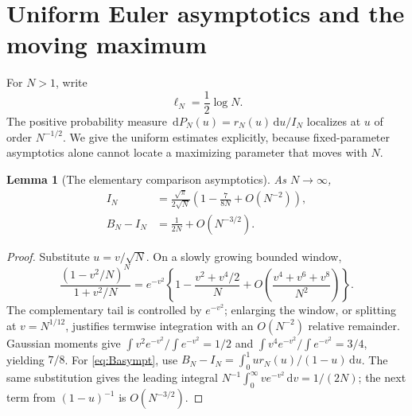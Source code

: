 \documentclass[11pt]{article}
\numberwithin{equation}{section}
\newtheorem{lemma}[theorem]{Lemma}
\theoremstyle{definition}\newtheorem{definition}[theorem]{Definition}
\theoremstyle{remark}\newtheorem{remark}[theorem]{Remark}
\newcommand{\dd}{\,\mathrm d}
\begin{document}
\section{Uniform Euler asymptotics and the moving maximum}
\label{sec:uniformEuler}
For $N>1$, write
\begin{equation}\label{eq:ellN}
 \ell_N=\frac12\log N.
\end{equation}
The positive probability measure
$\dd P_N(u)=r_N(u)\dd u/I_N$ localizes at $u$ of order $N^{-1/2}$.
We give the uniform estimates explicitly, because fixed-parameter
asymptotics alone cannot locate a maximizing parameter that moves
with $N$.

\begin{lemma}[The elementary comparison asymptotics]\label{lem:Iasympt}
As $N\to\infty$,
\begin{align}
 I_N&=\frac{\sqrt\pi}{2\sqrt N}
       \left(1-\frac7{8N}+O(N^{-2})\right),\label{eq:Iasympt}\\
 B_N-I_N&=\frac1{2N}+O(N^{-3/2}).\label{eq:Basympt}
\end{align}
\end{lemma}
\begin{proof}
Substitute $u=v/\sqrt N$. On a slowly growing bounded window,
\[
 \frac{(1-v^2/N)^N}{1+v^2/N}
 =e^{-v^2}\left\{1-\frac{v^2+v^4/2}{N}
       +O\left(\frac{v^4+v^6+v^8}{N^2}\right)\right\}.
\]
The complementary tail is controlled by $e^{-v^2}$; enlarging the
window, or splitting at $v=N^{1/12}$, justifies termwise integration
with an $O(N^{-2})$ relative remainder. Gaussian moments give
$\int v^2e^{-v^2}/\int e^{-v^2}=1/2$ and
$\int v^4e^{-v^2}/\int e^{-v^2}=3/4$, yielding $7/8$.
For \eqref{eq:Basympt}, use
$B_N-I_N=\int_0^1u r_N(u)/(1-u)\dd u$. The same substitution gives
the leading integral $N^{-1}\int_0^\infty ve^{-v^2}\dd v=1/(2N)$;
the next term from $(1-u)^{-1}$ is $O(N^{-3/2})$.
\end{proof}
\end{document}
